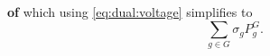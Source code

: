 \documentclass[10pt,a4paper]{amsart}
\renewenvironment{proof}[1]{\par\medskip\noindent\textbf{#1}\enspace\ignorespaces}{\par\medskip}
\begin{document}
\begin{proof}{of }
    which using \eqref{eq:dual:voltage} simplifies to
    \begin{equation}
        \sum_{g \in G}\sigma_g P^G_g.
    \end{equation}
\end{proof}
\end{document}

